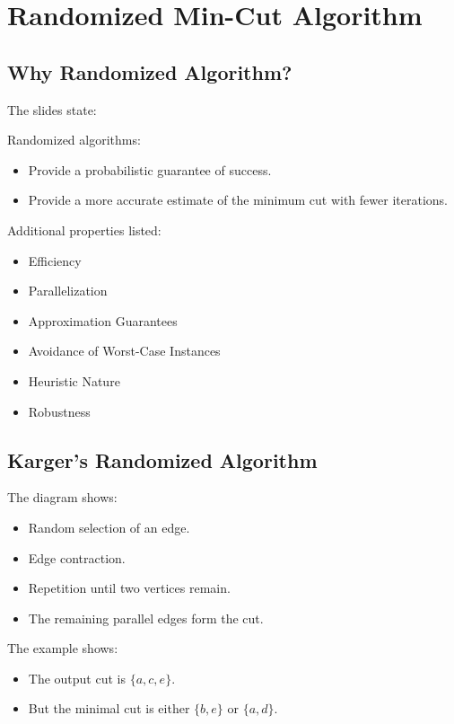 \documentclass[12pt]{article}
\begin{document}
\section{Randomized Min-Cut Algorithm}

\subsection{Why Randomized Algorithm?}

The slides state:

Randomized algorithms:

\begin{itemize}
    \item Provide a probabilistic guarantee of success.
    \item Provide a more accurate estimate of the minimum cut with fewer iterations.
\end{itemize}

Additional properties listed:

\begin{itemize}
    \item Efficiency
    \item Parallelization
    \item Approximation Guarantees
    \item Avoidance of Worst-Case Instances
    \item Heuristic Nature
    \item Robustness
\end{itemize}

\subsection{Karger’s Randomized Algorithm}

The diagram shows:

\begin{itemize}
    \item Random selection of an edge.
    \item Edge contraction.
    \item Repetition until two vertices remain.
    \item The remaining parallel edges form the cut.
\end{itemize}

The example shows:

\begin{itemize}
    \item The output cut is $\{a, c, e\}$.
    \item But the minimal cut is either $\{b, e\}$ or $\{a, d\}$.
\end{itemize}
\end{document}
